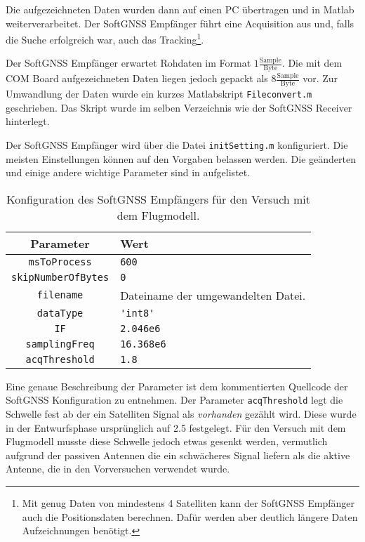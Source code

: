Die aufgezeichneten Daten wurden dann auf einen PC übertragen und in Matlab weiterverarbeitet. Der SoftGNSS Empfänger führt eine Acquisition aus und, falls die Suche erfolgreich war, auch das Tracking\footnote{Mit genug Daten von mindestens 4 Satelliten kann der SoftGNSS Empfänger auch die Positionsdaten berechnen. Dafür werden aber deutlich längere Daten Aufzeichnungen benötigt.}.

Der SoftGNSS Empfänger erwartet Rohdaten im Format $1\frac{\textrm{Sample}}{\textrm{Byte}}$. Die mit dem COM Board aufgezeichneten Daten liegen jedoch gepackt als $8\frac{\textrm{Sample}}{\textrm{Byte}}$ vor. Zur Umwandlung der Daten wurde ein kurzes Matlabskript \lstinline$Fileconvert.m$ geschrieben. Das Skript wurde im selben Verzeichnis wie der SoftGNSS Receiver hinterlegt.

Der SoftGNSS Empfänger wird über die Datei \lstinline$initSetting.m$ konfiguriert. Die meisten Einstellungen können auf den Vorgaben belassen werden. Die geänderten und einige andere wichtige Parameter sind in  aufgelistet.

\begin{table}[htbp]
    \ttabbox
    {
        \caption[Konfiguration des SoftGNSS Empfängers]{Konfiguration des SoftGNSS Empfängers für den Versuch mit dem \dscubesat Flugmodell.}
        \label{SoftGNSSConfig}
    }
    {
    \begin{tabular}{c p{3cm}}
        \toprule
        Parameter               & Wert \\
        \midrule
        \lstinline$msToProcess$         & \lstinline{600} \\
        \lstinline$skipNumberOfBytes$   & \lstinline{0} \\
        \lstinline$filename$            & Dateiname der umgewandelten Datei. \\
        \lstinline$dataType$            & \lstinline$'int8'$ \\
        \lstinline$IF$                  & \lstinline$2.046e6$ \\
        \lstinline$samplingFreq$        & \lstinline$16.368e6$ \\
        \lstinline$acqThreshold$        & \lstinline$1.8$ \\
        \bottomrule
    \end{tabular}
}
\end{table}

Eine genaue Beschreibung der Parameter ist dem kommentierten Quellcode der SoftGNSS Konfiguration zu entnehmen. Der Parameter \lstinline$acqThreshold$ legt die Schwelle fest ab der ein Satelliten Signal als \emph{vorhanden} gezählt wird. Diese wurde in der Entwurfsphase ursprünglich auf \num{2.5} festgelegt. Für den Versuch mit dem Flugmodell musste diese Schwelle jedoch etwas gesenkt werden, vermutlich aufgrund der passiven Antennen die ein schwächeres Signal liefern als die aktive Antenne, die in den Vorversuchen verwendet wurde.

